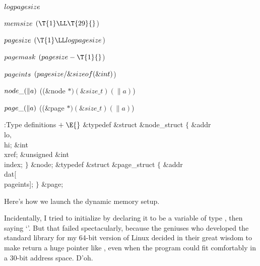 \Y\B\4\D$\\{logpagesize}$ \5
\par
\B\4\D$\\{memsize}$ \5
$(\T{1}\LL\T{29}{}$)\Y\par
\B\4\D$\\{pagesize}$ \5
$(\T{1}\LL\\{logpagesize}{}$)\par
\B\4\D$\\{pagemask}$ \5
$(\\{pagesize}-\T{1}{}$)\par
\B\4\D$\\{pageints}$ \5
$(\\{pagesize}/\&{sizeof}(\&{int}){}$)\par
\B\4\D$\\{node\_}(\|a)$ \5
((\&{node} ${}{*})(\&{size\_t})(\|a){}$)\par
\B\4\D$\\{page\_}(\|a)$ \5
((\&{page} ${}{*})(\&{size\_t})(\|a){}$)\par
\Y\B\4:Type definitions\X${}\mathrel+\E{}$\6
\&{typedef} \&{struct} \&{node\_struct} ${}\{{}$\1\6
\&{addr} \\{lo}${},{}$ \\{hi};\6
\&{int} \\{xref};\6
\&{unsigned} \&{int} \\{index};\2\6
${}\}{}$ \&{node};\6
\&{typedef} \&{struct} \&{page\_struct} ${}\{{}$\1\6
\&{addr} \\{dat}[\\{pageints}];\2\6
${}\}{}$ \&{page};\par
\fi

Here's how we launch the dynamic memory setup.

Incidentally, I tried to initialize  by declaring it to be
a variable of type , then saying `'.
But that failed spectacularly, because the geniuses who developed
the standard library for my 64-bit version of Linux decided in their
great wisdom to make  return a huge pointer like
, even when the program could fit comfortably in
a 30-bit address space. D'oh.

